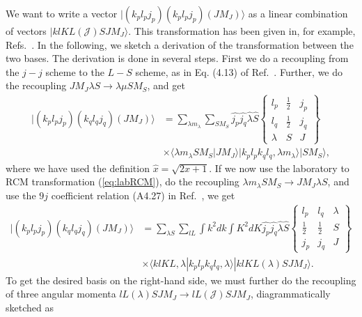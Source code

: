 \documentclass[a4paper,12pt]{report}
\begin{document}
We want to write a vector 
$|(k_{p}l_{p}j_{p})(k_{p}l_{p}j_{p})(JM_{J})\rangle $ as a linear 
combination of vectors $|klKL(\mathcal{J})SJM_{J}\rangle $.
This transformation has been given in, for example, 
Refs.~\cite{kung1979,hjensen1993}. In the following, we
sketch a derivation of the transformation between the two
bases. The derivation is done in several steps. First we do 
a recoupling from the $j\!-\!j$ scheme to the $L\! -\! S$ 
scheme, as in Eq. (4.13) of Ref.~\cite{lawson}. Further, we 
do the recoupling 
$JM_{J}\lambda S \longrightarrow \lambda \mu SM_{S}$, and get
\begin{align}
  |(k_{p}l_{p}j_{p})(k_{q}l_{q}j_{q})(JM_{J})\rangle &=
  \sum_{\lambda m_{\lambda }}\sum_{S M_{S}} 
  \hat{j_{p}}\hat{j_{q}}\hat{\lambda }\hat{S} 
  \left\{ \begin{array}{ccc}
    l_{p} & \frac{1}{2} & j_{p} \\
    l_{q} & \frac{1}{2} & j_{q} \\
    \lambda & S & J 
    \end{array} \right\} \nonumber \\
   & \times \langle \lambda m_{\lambda }SM_{S}|JM_{J}\rangle 
   |k_{p}l_{p}k_{q}l_{q},\lambda m_{\lambda } \rangle |SM_{S}\rangle , 
\end{align}
where we have used the definition $\hat{x}=\sqrt{2x+1}$. 
If we now use the laboratory to RCM transformation 
(\ref{eq:labRCM}), do the recoupling 
$\lambda m_{\lambda }SM_{S} \longrightarrow JM_{J}\lambda S$, 
and use the $9j$ coefficient relation (A4.27) in 
Ref.~\cite{lawson}, we get 
\begin{align}
  |(k_{p}l_{p}j_{p})(k_{q}l_{q}j_{q})(JM_{J})\rangle &=
  \sum_{\lambda S}\sum_{lL}\int k^{2}dk \int K^{2}dK 
  \hat{j_{p}}\hat{j_{q}}\hat{\lambda }\hat{S}
  \left\{ \begin{array}{ccc}
    l_{p} & l_{q} & \lambda \\
    \frac{1}{2} & \frac{1}{2} & S \\
    j_{p} & j_{q} & J 
    \end{array} \right\} \nonumber \\
    & \times 
  \langle klKL,\lambda |k_{p}l_{p}k_{q}l_{q},\lambda \rangle 
  |klKL(\lambda )SJM_{J}\rangle .
\end{align}     
To get the desired basis on the right-hand side, we must further do the recoupling of three angular momenta $lL(\lambda )SJM_{J} \longrightarrow lL(\mathcal{J})SJM_{J}$, diagrammatically sketched as \cite{lawson}
\end{document}
